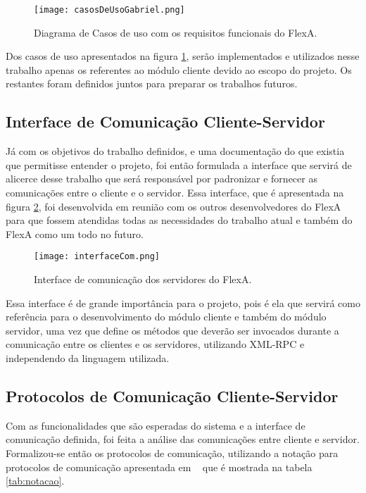         \begin{figure}[!ht]
        \centering
        \texttt{[image: casosDeUsoGabriel.png]}
        \caption{Diagrama de Casos de uso com os requisitos funcionais do FlexA.}
        \label{fig:casosDeUsoGabriel}
        \end{figure}
    
        Dos casos de uso apresentados na figura \ref{fig:casosDeUsoGabriel}, serão implementados e utilizados nesse trabalho apenas os referentes ao módulo cliente devido ao escopo do projeto. Os restantes foram definidos juntos para preparar os trabalhos futuros.
        
        \subsection{Interface de Comunicação Cliente-Servidor}
        
        Já com os objetivos do trabalho definidos, e uma documentação do que existia que permitisse entender o projeto, foi então formulada a interface que servirá de alicerce desse trabalho que será responsável por padronizar e fornecer as comunicações entre o cliente e o servidor. Essa interface, que é apresentada na figura   \ref{fig:interfaceComunicacao}, foi desenvolvida em reunião com os outros desenvolvedores do FlexA para que fossem atendidas todas as necessidades do trabalho atual e também do FlexA como um todo no futuro.
       
        \begin{figure}
        \centering
        \texttt{[image: interfaceCom.png]}
        \caption{Interface de comunicação dos servidores do FlexA.}
        \label{fig:interfaceComunicacao}
        \end{figure}
        
        Essa interface é de grande importância para o projeto, pois é ela que servirá como referência para o desenvolvimento do módulo cliente e também do módulo servidor, uma vez que define os métodos que deverão ser invocados durante a comunicação entre os clientes e os servidores, utilizando XML-RPC e independendo da linguagem utilizada.
        
        \subsection{Protocolos de Comunicação Cliente-Servidor}
        
        Com as funcionalidades que são esperadas do sistema e a interface de comunicação definida, foi feita a análise das comunicações entre cliente e servidor. Formalizou-se então os protocolos de comunicação, utilizando a notação para protocolos de comunicação apresentada em ~\cite{ross} que é mostrada na tabela \ref{tab:notacao}. 
        
